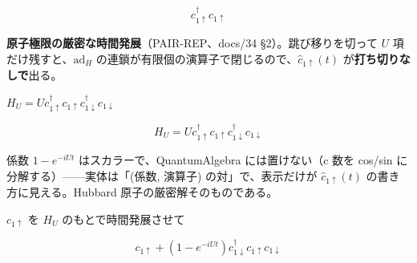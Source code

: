 \documentclass[dvipdfmx,a4paper,11pt]{jsarticle}
\begin{document}
\begin{equation}
  {c}_{1{\uparrow}}^{\dagger} {c}_{1{\uparrow}}
  \label{eq:E20}
\end{equation}

\textbf{原子極限の厳密な時間発展}（PAIR-REP、docs/34 §2）。跳び移りを切って $U$ 項だけ残すと、$\mathrm{ad}_H$ の連鎖が有限個の演算子で閉じるので、$\hat c_{1\uparrow}(t)$ が\textbf{打ち切りなしで}出る。

$H_U = U c^\dagger_{1\uparrow} c_{1\uparrow} c^\dagger_{1\downarrow} c_{1\downarrow}$

\begin{equation}
  H_U = U c^\dagger_{1\uparrow} c_{1\uparrow} c^\dagger_{1\downarrow} c_{1\downarrow}
  \label{eq:E21}
\end{equation}

係数 $1-e^{-iUt}$ はスカラーで、QuantumAlgebra には置けない（c 数を cos/sin に分解する）——実体は「(係数, 演算子) の対」で、表示だけが $\hat c_{1\uparrow}(t)$ の書き方に見える。Hubbard 原子の厳密解そのものである。

$c_{1\uparrow}$ を $H_U$ のもとで時間発展させて

\begin{equation}
  c_{1\uparrow} + \left(1 - e^{- i U t}\right) c^{\dagger}_{1\downarrow} c_{1\uparrow} c_{1\downarrow}
  \label{eq:E22}
\end{equation}
\end{document}
